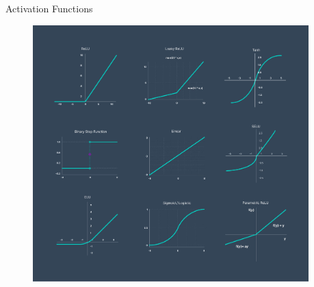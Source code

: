 \begin{frame}{Activation Functions}
    \begin{figure}
    \centering
    \includegraphics[width=0.95\textwidth,height=0.95\textheight,keepaspectratio]{images/cnn/activation-functions.png}
    \end{figure}
\end{frame}
